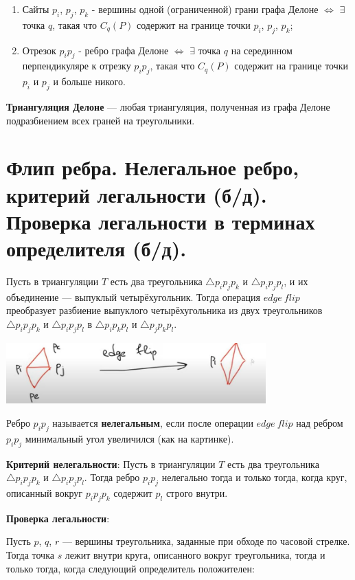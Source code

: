 \begin{enumerate}
    \item Сайты $p_i$, $p_j$, $p_k$ - вершины одной (ограниченной) грани графа Делоне $\Leftrightarrow$ $\exists$ точка $q$, такая что $C_q (P)$ содержит на границе точки $p_i$, $p_j$, $p_k$;
    \item Отрезок $p_i p_j$ - ребро графа Делоне $\Leftrightarrow$ $\exists$ точка $q$ на серединном перпендикуляре к отрезку $p_i p_j$, такая что $C_q (P)$ содержит на границе точки $p_i$ и $p_j$ и больше никого.
\end{enumerate}

\textbf{Триангуляция Делоне} — любая триангуляция, полученная из графа Делоне подразбиением всех граней на треугольники.
\newpage{}

\section{Флип ребра. Нелегальное ребро, критерий легальности (б/д). Проверка легальности в терминах определителя (б/д).}

Пусть в триангуляции $T$ есть два треугольника $\triangle p_i p_j p_k$ и $\triangle p_i p_j p_l$, и их объединение — выпуклый четырёхугольник. Тогда операция $edge \ flip$ преобразует разбиение выпуклого четырёхугольника из двух треугольников $\triangle p_i p_j p_k$ и $\triangle p_i p_j p_l$ в $\triangle p_i p_k p_l$ и $\triangle p_j p_k p_l$.

\includegraphics[width=10cm]{images/flip.JPG}

Ребро $p_i p_j$ называется \textbf{нелегальным}, если после операции $edge \ flip$ над ребром $p_i p_j$ минимальный угол увеличился (как на картинке).

\textbf{Критерий нелегальности}: Пусть в триангуляции $T$ есть два треугольника $\triangle p_i p_j p_k$ и $\triangle p_i p_j p_l$. Тогда ребро $p_i p_j$ нелегально тогда и только тогда, когда круг, описанный вокруг $p_i p_j p_k$ содержит $p_l$ строго внутри.

\textbf{Проверка легальности}:

Пусть $p$, $q$, $r$ — вершины треугольника, заданные при обходе по часовой стрелке. Тогда точка $s$ лежит внутри круга, описанного вокруг треугольника, тогда и только тогда, когда следующий определитель положителен:

